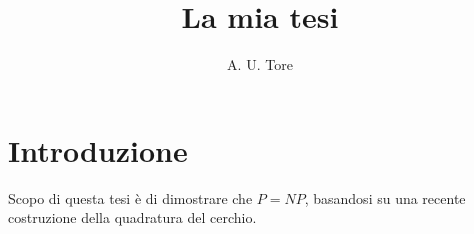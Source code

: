 \documentclass[a4paper,titlepage]{amsbook}
\begin{document}
\title{La mia tesi}
\author{A. U. Tore}
\maketitle

\frontmatter

\tableofcontents

\chapter{Introduzione}

Scopo di questa tesi \`e di dimostrare
che $P=NP$, basandosi su una recente
costruzione della quadratura del cerchio.
\end{document}
